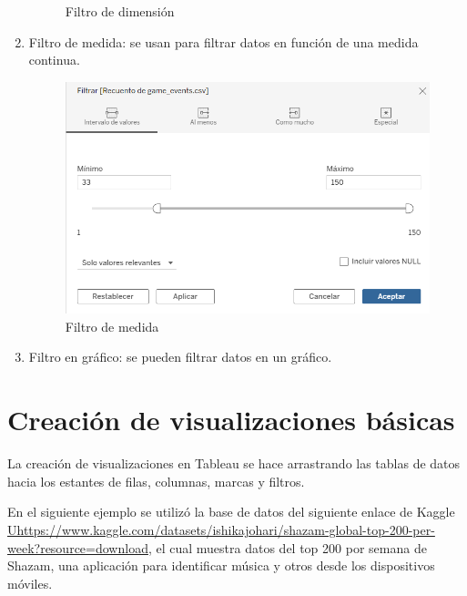 \documentclass[a4paper, 12pt]{book}
\begin{document}
\begin{enumerate}
\begin{figure}[H]
		\caption{Filtro de dimensión}
	\end{figure}
	\item Filtro de medida: se usan para filtrar datos en función de una medida continua.
	\begin{figure}[H] 
		\centering 
		\includegraphics[width=0.5\linewidth]{filtro4.png}
		\caption{Filtro de medida}
	\end{figure}
	\item Filtro en gráfico: se pueden filtrar datos en un gráfico.
\end{enumerate}

\section{Creación de visualizaciones básicas}
La creación de visualizaciones en Tableau se hace arrastrando las tablas de datos hacia los estantes de filas, columnas, marcas y filtros.

En el siguiente ejemplo se utilizó la base de datos del siguiente enlace de Kaggle \url{Uhttps://www.kaggle.com/datasets/ishikajohari/shazam-global-top-200-per-week?resource=download}, el cual muestra datos del top 200 por semana de Shazam, una aplicación para identificar música y otros desde los dispositivos móviles.
\end{document}
